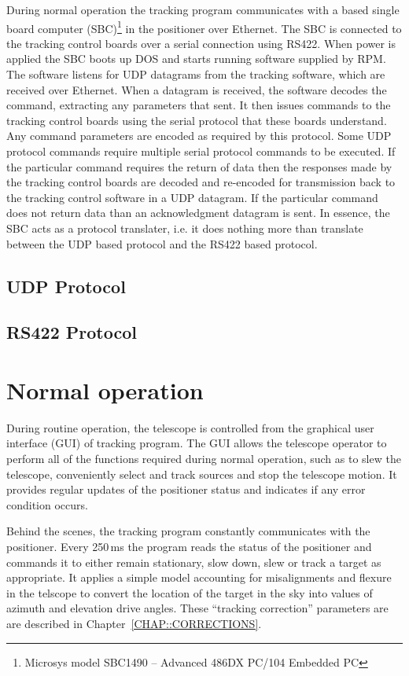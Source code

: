 \documentclass[letterpaper,12pt]{report}
\begin{document}
During normal operation the tracking program communicates with a based
single board computer (SBC)\footnote{Microsys model SBC1490 --
Advanced 486DX PC/104 Embedded PC} in the positioner over
Ethernet. The SBC is connected to the tracking control boards over a
serial connection using RS422. When power is applied the SBC boots up
DOS and starts running software supplied by RPM. The software listens
for UDP datagrams from the tracking software, which are received over
Ethernet. When a datagram is received, the software decodes the
command, extracting any parameters that sent. It then issues commands
to the tracking control boards using the serial protocol that these
boards understand. Any command parameters are encoded as required by
this protocol. Some UDP protocol commands require multiple serial
protocol commands to be executed. If the particular command requires
the return of data then the responses made by the tracking control
boards are decoded and re-encoded for transmission back to the
tracking control software in a UDP datagram. If the particular command
does not return data than an acknowledgment datagram is sent. In
essence, the SBC acts as a protocol translater, i.e. it does nothing
more than translate between the UDP based protocol and the RS422 based
protocol.



\section{UDP Protocol}

\section{RS422 Protocol}

\chapter{Normal operation}
\label{CHAP::NORMAL}
\thispagestyle{fancy}

During routine operation, the telescope is controlled from the
graphical user interface (GUI) of tracking program. The GUI allows the
telescope operator to perform all of the functions required during
normal operation, such as to slew the telescope, conveniently select
and track sources and stop the telescope motion. It provides regular
updates of the positioner status and indicates if any error condition
occurs.

Behind the scenes, the tracking program constantly communicates with
the positioner. Every 250\,ms the program reads the status of the
positioner and commands it to either remain stationary, slow down,
slew or track a target as appropriate. It applies a simple model
accounting for misalignments and flexure in the telscope to convert
the location of the target in the sky into values of azimuth and
elevation drive angles. These ``tracking correction'' parameters are
are described in Chapter~\ref{CHAP::CORRECTIONS}.
\end{document}
